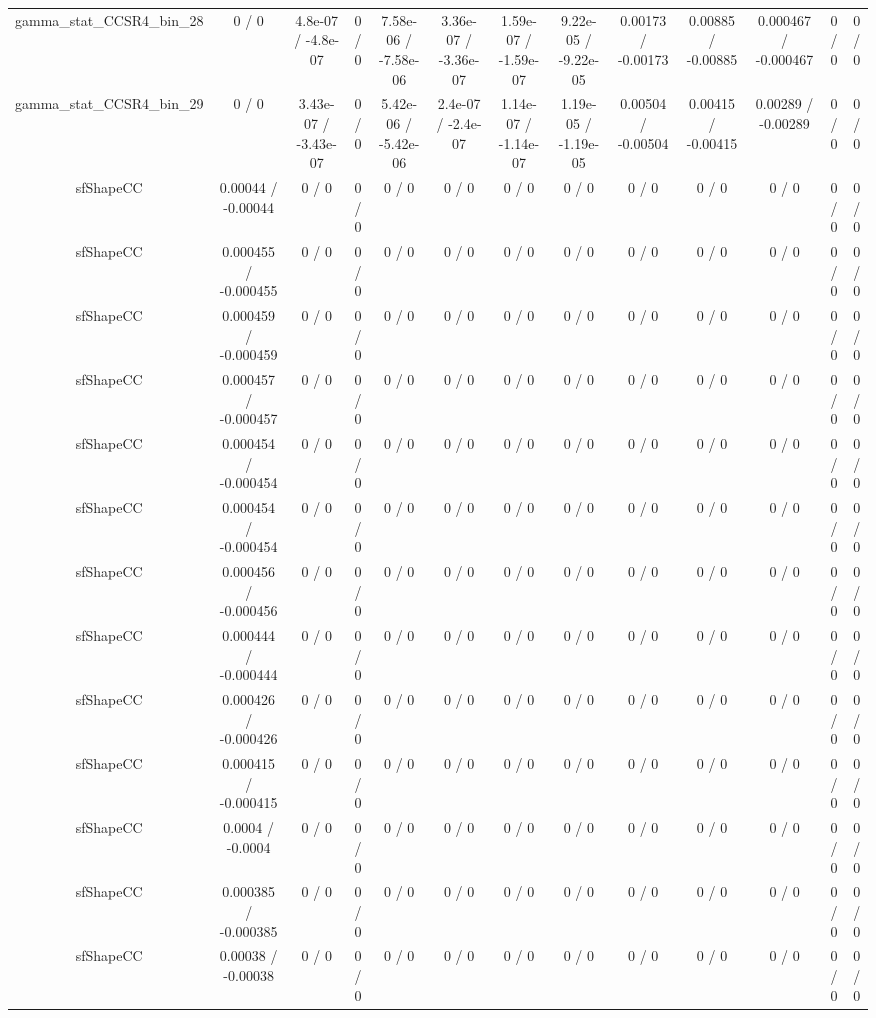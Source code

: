 \documentclass[10pt]{article}
\begin{document}
\begin{table}[htbp]
\begin{center}
\begin{tabular}{|c|c|c|c|c|c|c|c|c|c|c|c|c|}
  gamma_stat_CCSR4_bin_28 & 0 / 0 & 4.8e-07 / -4.8e-07 & 0 / 0 & 7.58e-06 / -7.58e-06 & 3.36e-07 / -3.36e-07 & 1.59e-07 / -1.59e-07 & 9.22e-05 / -9.22e-05 & 0.00173 / -0.00173 & 0.00885 / -0.00885 & 0.000467 / -0.000467 & 0 / 0 & 0 / 0 \\ 
  gamma_stat_CCSR4_bin_29 & 0 / 0 & 3.43e-07 / -3.43e-07 & 0 / 0 & 5.42e-06 / -5.42e-06 & 2.4e-07 / -2.4e-07 & 1.14e-07 / -1.14e-07 & 1.19e-05 / -1.19e-05 & 0.00504 / -0.00504 & 0.00415 / -0.00415 & 0.00289 / -0.00289 & 0 / 0 & 0 / 0 \\ 
  sfShapeCC & 0.00044 / -0.00044 & 0 / 0 & 0 / 0 & 0 / 0 & 0 / 0 & 0 / 0 & 0 / 0 & 0 / 0 & 0 / 0 & 0 / 0 & 0 / 0 & 0 / 0 \\ 
  sfShapeCC & 0.000455 / -0.000455 & 0 / 0 & 0 / 0 & 0 / 0 & 0 / 0 & 0 / 0 & 0 / 0 & 0 / 0 & 0 / 0 & 0 / 0 & 0 / 0 & 0 / 0 \\ 
  sfShapeCC & 0.000459 / -0.000459 & 0 / 0 & 0 / 0 & 0 / 0 & 0 / 0 & 0 / 0 & 0 / 0 & 0 / 0 & 0 / 0 & 0 / 0 & 0 / 0 & 0 / 0 \\ 
  sfShapeCC & 0.000457 / -0.000457 & 0 / 0 & 0 / 0 & 0 / 0 & 0 / 0 & 0 / 0 & 0 / 0 & 0 / 0 & 0 / 0 & 0 / 0 & 0 / 0 & 0 / 0 \\ 
  sfShapeCC & 0.000454 / -0.000454 & 0 / 0 & 0 / 0 & 0 / 0 & 0 / 0 & 0 / 0 & 0 / 0 & 0 / 0 & 0 / 0 & 0 / 0 & 0 / 0 & 0 / 0 \\ 
  sfShapeCC & 0.000454 / -0.000454 & 0 / 0 & 0 / 0 & 0 / 0 & 0 / 0 & 0 / 0 & 0 / 0 & 0 / 0 & 0 / 0 & 0 / 0 & 0 / 0 & 0 / 0 \\ 
  sfShapeCC & 0.000456 / -0.000456 & 0 / 0 & 0 / 0 & 0 / 0 & 0 / 0 & 0 / 0 & 0 / 0 & 0 / 0 & 0 / 0 & 0 / 0 & 0 / 0 & 0 / 0 \\ 
  sfShapeCC & 0.000444 / -0.000444 & 0 / 0 & 0 / 0 & 0 / 0 & 0 / 0 & 0 / 0 & 0 / 0 & 0 / 0 & 0 / 0 & 0 / 0 & 0 / 0 & 0 / 0 \\ 
  sfShapeCC & 0.000426 / -0.000426 & 0 / 0 & 0 / 0 & 0 / 0 & 0 / 0 & 0 / 0 & 0 / 0 & 0 / 0 & 0 / 0 & 0 / 0 & 0 / 0 & 0 / 0 \\ 
  sfShapeCC & 0.000415 / -0.000415 & 0 / 0 & 0 / 0 & 0 / 0 & 0 / 0 & 0 / 0 & 0 / 0 & 0 / 0 & 0 / 0 & 0 / 0 & 0 / 0 & 0 / 0 \\ 
  sfShapeCC & 0.0004 / -0.0004 & 0 / 0 & 0 / 0 & 0 / 0 & 0 / 0 & 0 / 0 & 0 / 0 & 0 / 0 & 0 / 0 & 0 / 0 & 0 / 0 & 0 / 0 \\ 
  sfShapeCC & 0.000385 / -0.000385 & 0 / 0 & 0 / 0 & 0 / 0 & 0 / 0 & 0 / 0 & 0 / 0 & 0 / 0 & 0 / 0 & 0 / 0 & 0 / 0 & 0 / 0 \\ 
  sfShapeCC & 0.00038 / -0.00038 & 0 / 0 & 0 / 0 & 0 / 0 & 0 / 0 & 0 / 0 & 0 / 0 & 0 / 0 & 0 / 0 & 0 / 0 & 0 / 0 & 0 / 0 \\ 

\end{tabular}
\end{center}
\end{table}
\end{document}

